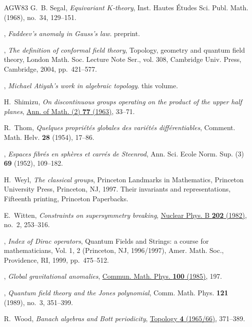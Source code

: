 \documentclass[11pt]{amsart}
\theoremstyle{definition}
\theoremstyle{remark}
\theoremstyle{plain}
\numberwithin{equation}{section}
\renewcommand{\:}{\colon}
\begin{document}
\begin{thebibliography}{AGW83}
G.~B. Segal, \emph{Equivariant {$K$}-theory}, Inst. Hautes {\'E}tudes Sci.
  Publ. Math. (1968), no.~34, 129--151.

\bysame, \emph{Faddeev's anomaly in Gauss's law}. preprint.

\bysame, \emph{The definition of conformal field theory}, Topology, geometry
  and quantum field theory, London Math. Soc. Lecture Note Ser., vol. 308,
  Cambridge Univ. Press, Cambridge, 2004, pp.~421--577.

\bysame, \emph{Michael Atiyah's work in algebraic topology}. this volume.

H.~Shimizu, \emph{On discontinuous groups operating on the product of the upper
  half planes}, \href{http://dx.doi.org/10.2307/1970201}{Ann. of Math. (2)
  \textbf{77} (1963)}, 33--71.

R.~Thom, \emph{Quelques propri{\'e}t{\'e}s globales des vari{\'e}t{\'e}s
  diff{\'e}rentiables}, Comment. Math. Helv. \textbf{28} (1954), 17--86.

\bysame, \emph{Espaces fibr\'{e}s en sph{\`e}res et carr\'{e}s de {S}teenrod},
  Ann. Sci. Ecole Norm. Sup. (3) \textbf{69} (1952), 109--182.

H.~Weyl, \emph{The classical groups}, Princeton Landmarks in Mathematics,
  Princeton University Press, Princeton, NJ, 1997. Their invariants and
  representations, Fifteenth printing, Princeton Paperbacks.

E.~Witten, \emph{Constraints on supersymmetry breaking},
  \href{http://dx.doi.org/10.1016/0550-3213(82)90071-2}{Nuclear Phys. B
  \textbf{202} (1982)}, no.~2, 253--316.

\bysame, \emph{Index of {D}irac operators}, Quantum Fields and Strings: a
  course for mathematicians, {V}ol. 1, 2 ({P}rinceton, {NJ}, 1996/1997), Amer.
  Math. Soc., Providence, RI, 1999, pp.~475--512.

\bysame, \emph{Global gravitational anomalies},
  \href{http://dx.doi.org/10.1007/BF01212448}{Commun. Math. Phys. \textbf{100}
  (1985)},
197.

\bysame, \emph{Quantum field theory and the {J}ones polynomial}, Comm. Math.
  Phys. \textbf{121} (1989), no.~3, 351--399.

R.~Wood, \emph{Banach algebras and {B}ott periodicity},
  \href{http://dx.doi.org/10.1016/0040-9383(66)90035-8}{Topology \textbf{4}
  (1965/66)}, 371--389.

\end{thebibliography}
\end{document}
